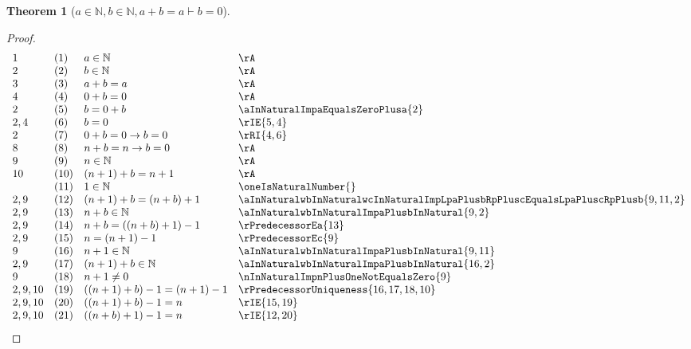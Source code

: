\documentclass{book}
\theoremstyle{plain}
\newtheorem{theorem}{Theorem}
\theoremstyle{remark}
\theoremstyle{definition}
\begin{document}
\label{aInNaturalwbInNaturalwaPlusbEqualsaImpbEqualsZero}
\begin{theorem}[\(a\in\mathbb{N}, b\in\mathbb{N}, a+b=a\vdash b=0\)]
\end{theorem}
\begin{proof}
        \[
	\begin{array}{llll}
            1       &  (1)  & a\in\mathbb{N} & \rA \\
            2       &  (2)  & b\in\mathbb{N} & \rA \\
            3       &  (3)  & a+b=a & \rA \\
            4       &  (4)  & 0+b=0 & \rA \\
            2       &  (5)  & b=0+b & \aInNaturalImpaEqualsZeroPlusa{2} \\
            2,4     &  (6)  & b=0 & \rIE{5,4} \\
            2       &  (7)  & 0+b=0\rightarrow b=0 & \rRI{4,6} \\
            8       &  (8)  & n+b=n\rightarrow b=0 & \rA \\
            9       &  (9)  & n\in\mathbb{N} & \rA \\
            10      &  (10)  & (n+1)+b=n+1 & \rA \\
                    &  (11)  & 1\in\mathbb{N} & \oneIsNaturalNumber{} \\
            2,9     &  (12) & (n+1)+b=(n+b)+1 & \aInNaturalwbInNaturalwcInNaturalImpLpaPlusbRpPluscEqualsLpaPluscRpPlusb{9,11,2} \\
            2,9     &  (13) & n+b\in\mathbb{N} & \aInNaturalwbInNaturalImpaPlusbInNatural{9,2} \\
            2,9     &  (14) & n+b=((n+b)+1)-1 & \rPredecessorEa{13} \\
            2,9     &  (15) & n=(n+1)-1 & \rPredecessorEc{9} \\
            9       &  (16) & n+1\in\mathbb{N} & \aInNaturalwbInNaturalImpaPlusbInNatural{9,11} \\
            2,9     &  (17) & (n+1)+b\in\mathbb{N} & \aInNaturalwbInNaturalImpaPlusbInNatural{16,2} \\
            9       &  (18) & n+1\neq 0 & \nInNaturalImpnPlusOneNotEqualsZero{9} \\
            2,9,10  &  (19) & ((n+1)+b)-1=(n+1)-1 & \rPredecessorUniqueness{16,17,18,10} \\
            2,9,10  &  (20) & ((n+1)+b)-1=n & \rIE{15,19} \\
            2,9,10  &  (21) & ((n+b)+1)-1=n & \rIE{12,20} \\

\end{array}\]
\end{proof}
\end{document}

